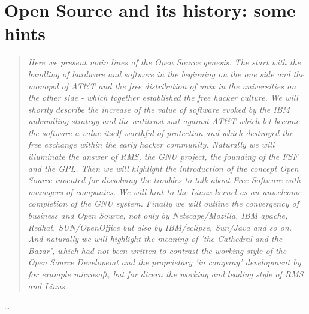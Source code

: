 %
%
%
%
%



\section{Open Source and its history: some hints}
\footnotesize
\begin{quote}\itshape
Here we present main lines of the Open Source genesis: The start with the
bundling of hardware and software in the beginning on the one side and the
monopol of AT\&T and the free distribution of unix in the universities on the
other side - which together established the free hacker culture. We will shortly
describe the increase of the value of software evoked by the IBM unbundling
strategy and the antitrust suit against AT\&T which let become the software a
value itself worthful of protection and which destroyed the free exchange within
the early hacker community. Naturally we will illuminate the answer of RMS, the
GNU project, the founding of the FSF and the GPL. Then we will highlight the
introduction of the concept Open Source invented for dissolving the troubles to
talk about Free Software with managers of companies. We will hint to the Linux
kernel as an unwelcome completion of the GNU system. Finally we will outline the
convergency of business and Open Source, not only by Netscape/Mozilla, IBM
apache, Redhat, SUN/OpenOffice but also by IBM/eclipse, Sun/Java and so on. And
naturally we will highlight the meaning of 'the Cathedral and the Bazar', which
had not been written to contrast the working style of the Open Source Developemt
and the proprietary 'in company' development by for example microsoft, but for
dicern the working and leading style of RMS and Linus.
\end{quote}
\normalsize
\ldots

%
